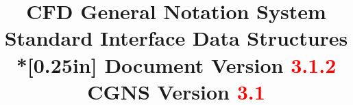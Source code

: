 \documentclass[11pt,twoside]{article}
\begin{document}
%
%
%


\fancyfoot[LE,RO]{\bfseries \thepage}

\posttitle{\par\end{flushleft}\vskip 1.0em}
\title{{\bfseries CFD General Notation System\\
Standard Interface Data Structures}\\*[0.25in]
{\Large Document Version \textcolor{red}{3.1.2}\\
CGNS Version \textcolor{red}{3.1}}}
\author{}
\date{}
\maketitle
\thispagestyle{empty}

\end{document}
